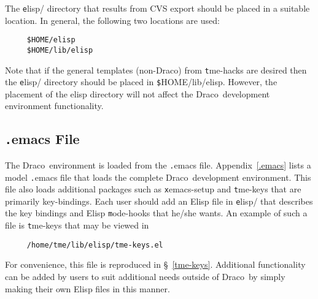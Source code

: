 \documentclass[11pt]{nmemo}
\newcommand{\comp}[1]{{\normalfont\texttt#1}}
\newcommand{\draco}{{\normalfont\sffamily Draco}}
\begin{document}
The \comp{elisp/} directory that results from CVS export should be
placed in a suitable location.  In general, the following two
locations are used:
\begin{verbatim}
     $HOME/elisp
     $HOME/lib/elisp
\end{verbatim}
Note that if the general templates (non-\draco) from \comp{tme-hacks}
are desired then the \comp{elisp/} directory should be placed in
\comp{\$HOME/lib/elisp}.  However, the placement of the elisp
directory will not affect the \draco\ development environment
functionality.

\subsection{\comp{.emacs} File}
\label{sec:.emacs}

The \draco\ environment is loaded from the \comp{.emacs} file.
Appendix~\ref{.emacs} lists a model \comp{.emacs} file that loads the
complete \draco\ development environment.  This file also loads
additional packages such as \comp{xemacs-setup} and \comp{tme-keys}
that are primarily key-bindings.  Each user should add an Elisp file
in \comp{elisp/} that describes the key bindings and Elisp
\comp{mode-hooks} that he/she wants.  An example of such a file is
\comp{tme-keys} that may be viewed in
\begin{verbatim}
     /home/tme/lib/elisp/tme-keys.el
\end{verbatim}
For convenience, this file is reproduced in \S~\ref{tme-keys}.
Additional functionality can be added by users to suit additional
needs outside of \draco\ by simply making their own Elisp files in
this manner.
\end{document}
